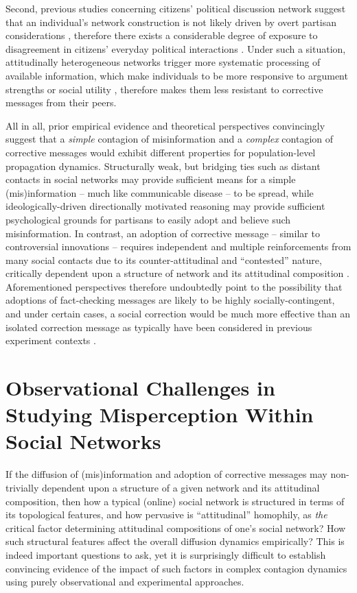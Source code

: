 \documentclass[man, 12pt, a4paper, nolmodern, noextraspace]{apa6}
\begin{document}
    Second, previous studies concerning citizens' political discussion network suggest that an individual's network construction is not likely driven by overt partisan considerations \parencite{song2015uncovering,lazer2010coevolution}, therefore there exists a considerable degree of exposure to disagreement in citizens' everyday political interactions \parencite[e.g.,][]{Bakshy1130, morey2012matters}. Under such a situation, attitudinally heterogeneous networks trigger more systematic processing of available information, which make individuals to be more responsive to argument strengths \parencite{levitan2008resistance} or social utility \parencite{messing2014selective}, therefore makes them less resistant to corrective messages from their peers.    

  All in all, prior empirical evidence and theoretical perspectives convincingly suggest that a \emph{simple} contagion of misinformation and a \emph{complex} contagion of corrective messages would exhibit different properties for population-level propagation dynamics. Structurally weak, but bridging ties such as distant contacts in social networks may provide sufficient means for a simple (mis)information -- much like communicable disease -- to be spread, while ideologically-driven directionally motivated reasoning may provide sufficient psychological grounds for partisans to easily adopt and believe such misinformation. In contrast, an adoption of corrective message -- similar to controversial innovations -- requires independent and multiple reinforcements from many social contacts due to its counter-attitudinal and \enquote{contested} nature, critically dependent upon a structure of network and its attitudinal composition \parencite{centola2007complex, Centola2010Sience, gonzalez2017decoding}. Aforementioned perspectives therefore undoubtedly point to the possibility that adoptions of fact-checking messages are likely to be highly socially-contingent, and under certain cases, a social correction would be much more effective than an isolated correction message as typically have been considered in previous experiment contexts \parencite[e.g.,][]{nyhan2010corrections,garrett2013undermining}.
    
\section{Observational Challenges in Studying Misperception Within Social Networks}

  If the diffusion of (mis)information and adoption of corrective messages may non-trivially dependent upon a structure of a given network and its attitudinal composition, then how a typical (online) social network is structured in terms of its topological features, and how pervasive is \enquote{attitudinal} homophily, as \emph{the} critical factor determining attitudinal compositions of one's social network? How such structural features affect the overall diffusion dynamics empirically? This is indeed important questions to ask, yet it is surprisingly difficult to establish convincing evidence of the impact of such factors in complex contagion dynamics using purely observational and experimental approaches.
    
\end{document}
